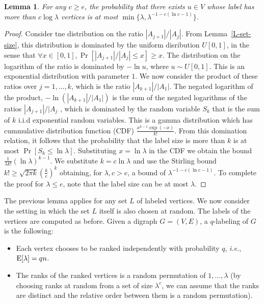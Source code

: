 \documentclass[11pt]{article}
\theoremstyle{plain}
\newtheorem{lem}[thm]{Lemma}
\theoremstyle{definition}
\theoremstyle{remark}
\numberwithin{equation}{section}
\begin{document}
\begin{lem}\label{L-label-size}
For any $c\geq e$,  the probability that there exists $u\in V$ whose
label has more than $c \log \lambda$ vertices is at most 
$\min\{\lambda, \lambda^{-1-c (\ln c -1)}\}$.
 \end{lem}
\begin{proof}
Consider tne distribution on the ratio $|A_{j+1}|/| A_j|$.  From
Lemma~\ref{L-set-size}, 
this distribution is
dominated by the uniform disribution $U[0,1]$, in the sense that
$\forall x\in [0,1],  \Pr[|A_{j+1}|/|A_j| \leq x]  \geq x$.  The
distribution on the logarithm of the ratio is dominated by  $-\ln u$,
where $u\sim U[0,1]$.  This is an exponential distribution with
parameter $1$.  We now consider the product of these ratios over $j=1,\ldots,k$,
which is the ratio $|A_{k+1}|/|A_1|$.
The negated logarithm of the product, $-\ln  (|A_{k+1}|/|A_1|)$  is
the sum of the negated  logarithms of the
ratios $|A_{j+1}|/|A_j$ , which is dominated by the random variable $S_k$ that is the
sum of $k$ i.i.d exponential random variables.  This is a gamma distribution
which has cummulative distribution function (CDF) 
$\frac{x^{k-1}\exp(-x)}{k!}$.  From this domination relation, it
follows that the
probability that the label size is more than $k$ is at most 
$\Pr[S_k \leq \ln \lambda]$.  Substituting $x=\ln \lambda$ in the
CDF  we obtain the bound
$\frac{1}{\lambda k!} (\ln\lambda)^{k-1}$.  We substitute  $k= c
\ln\lambda$ and use the Stirling bound
$k! \geq  \sqrt{2\pi k} \left(\frac{k}{e}\right)^k$
obtaining, for $\lambda,c > e$, a bound of $\lambda^{-1-c (\ln c -1)}$.
To complete the proof for $\lambda \leq e$, 
note that the label size can be at most $\lambda$.
\end{proof}



The previous lemma applies for any set $L$ of labeled vertices. We now
consider the setting in which the set $L$ itself is also chosen at
random. The labels of the vertices are computed as before.
 Given a digraph $G=(V,E)$, a $q$-labeling of $G$ is the following:
 \begin{itemize}
 \item Each  vertex chooses to be ranked independently with probability $q$, {\sl i.e.}, $\operatorname{E}[\lambda]=qn$.
 \item The ranks of the ranked vertices is a random permutation
  of $1,\ldots,\lambda$ (by choosing ranks at random from a set of size $\lambda^c$, we can assume that the ranks are distinct and the relative order between them is a random permutation).
 \end{itemize}
\end{document}

